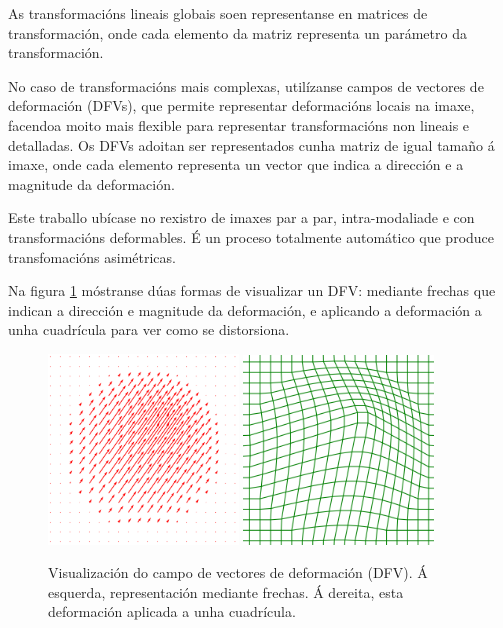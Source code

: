 As transformacións lineais globais soen representanse en matrices de transformación, onde cada elemento da matriz representa un parámetro da transformación.

No caso de transformacións mais complexas, utilízanse campos de vectores de deformación (\gls{DFV}s), que permite representar deformacións locais na imaxe, facendoa moito mais flexible para representar transformacións non lineais e detalladas.
Os DFVs adoitan ser representados cunha matriz de igual tamaño á imaxe, onde cada elemento representa un vector que indica a dirección e a magnitude da deformación.

Este traballo ubícase no rexistro de imaxes par a par, intra-modaliade e con transformacións deformables. É un proceso totalmente automático que produce transfomacións asimétricas.

Na figura \ref{fig:dfv_visualization} móstranse dúas formas de visualizar un DFV: mediante frechas que indican a dirección e magnitude da deformación, e aplicando a deformación a unha cuadrícula para ver como se distorsiona.

\begin{figure}[tbp]
    \centering
    \includegraphics[width=0.45\textwidth]{imaxes/dfv_arrows.png}
    \includegraphics[width=0.45\textwidth]{imaxes/dfv_grid.png}
    \caption{Visualización do campo de vectores de deformación (DFV). Á esquerda, representación mediante frechas. Á dereita, esta deformación aplicada a unha cuadrícula.}
    \label{fig:dfv_visualization}
\end{figure}

